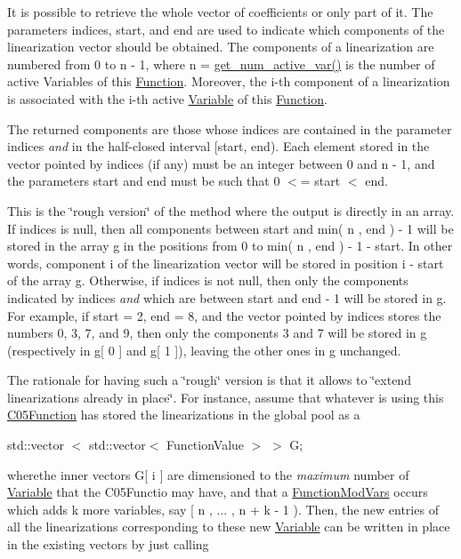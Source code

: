 It is possible to retrieve the whole vector of coefficients or only part of it. The parameters indices, start, and end are used to indicate which components of the linearization vector should be obtained. The components of a linearization are numbered from 0 to n -\/ 1, where n = \mbox{\hyperlink{class_s_m_spp__di__unipi__it_1_1_linear_function_a9e4e36559af1c5c8ecac72598b9fea4c}{get\+\_\+num\+\_\+active\+\_\+var()}} is the number of active Variables of this \mbox{\hyperlink{class_s_m_spp__di__unipi__it_1_1_function}{Function}}. Moreover, the i-\/th component of a linearization is associated with the i-\/th active \mbox{\hyperlink{class_s_m_spp__di__unipi__it_1_1_variable}{Variable}} of this \mbox{\hyperlink{class_s_m_spp__di__unipi__it_1_1_function}{Function}}.

The returned components are those whose indices are contained in the parameter indices {\itshape and} in the half-\/closed interval \mbox{[}start, end). Each element stored in the vector pointed by indices (if any) must be an integer between 0 and n -\/ 1, and the parameters start and end must be such that 0 $<$= start $<$ end.

This is the \char`\"{}rough version\char`\"{} of the method where the output is directly in an array. If indices is null, then all components between start and min( n , end ) -\/ 1 will be stored in the array g in the positions from 0 to min( n , end ) -\/ 1 -\/ start. In other words, component i of the linearization vector will be stored in position i -\/ start of the array g. Otherwise, if indices is not null, then only the components indicated by indices {\itshape and} which are between start and end -\/ 1 will be stored in g. For example, if start = 2, end = 8, and the vector pointed by indices stores the numbers 0, 3, 7, and 9, then only the components 3 and 7 will be stored in g (respectively in g\mbox{[} 0 \mbox{]} and g\mbox{[} 1 \mbox{]}), leaving the other ones in g unchanged.

The rationale for having such a \char`\"{}rough\char`\"{} version is that it allows to \char`\"{}extend linearizations already in place\char`\"{}. For instance, assume that whatever is using this \mbox{\hyperlink{class_s_m_spp__di__unipi__it_1_1_c05_function}{C05\+Function}} has stored the linearizations in the global pool as a

std\+::vector $<$ std\+::vector$<$ Function\+Value $>$ $>$ G;

wherethe inner vectors G\mbox{[} i \mbox{]} are dimensioned to the {\itshape maximum} number of \mbox{\hyperlink{class_s_m_spp__di__unipi__it_1_1_variable}{Variable}} that the C05\+Functio may have, and that a \mbox{\hyperlink{class_s_m_spp__di__unipi__it_1_1_function_mod_vars}{Function\+Mod\+Vars}} occurs which adds k more variables, say \mbox{[} n , ... , n + k -\/ 1 ). Then, the new entries of all the linearizations corresponding to these new \mbox{\hyperlink{class_s_m_spp__di__unipi__it_1_1_variable}{Variable}} can be written in place in the existing vectors by just calling

